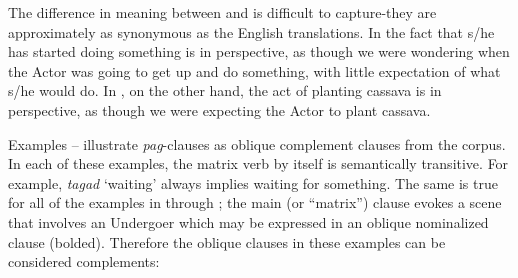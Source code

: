 The difference in meaning between  and  is difficult to capture-they are approximately as synonymous as the English translations. In  the fact that s/he has started doing something is in perspective, as though we were wondering when the Actor was going to get up and do something, with little expectation of what s/he would do. In , on the other hand, the act of planting cassava is in perspective, as though we were expecting the Actor to plant cassava.

Examples -- illustrate \textit{pag}{}-clauses as oblique complement clauses from the corpus. In each of these examples, the matrix verb by itself is semantically transitive. For example, \textit{tagad} ‘waiting’  always implies waiting for something. The same is true for all of the examples in  through ; the main (or “matrix”) clause evokes a scene that involves an Undergoer which may be expressed in an oblique nominalized clause (bolded). Therefore the oblique clauses in these examples can be considered complements:

